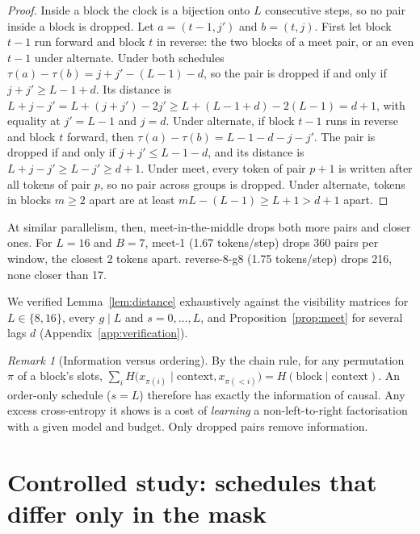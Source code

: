 \documentclass[11pt]{article}
\theoremstyle{definition}
\theoremstyle{remark}
\newtheorem{remark}{Remark}
\newcommand{\sch}[1]{\textsf{#1}}
\begin{document}
\begin{proof}
Inside a block the clock is a bijection onto $L$ consecutive steps, so no pair inside a block is dropped.
Let $a=(t-1,j')$ and $b=(t,j)$.
First let block $t-1$ run forward and block $t$ in reverse: the two blocks of a \sch{meet} pair, or an even $t-1$ under \sch{alternate}.
Under both schedules $\tau(a)-\tau(b)=j+j'-(L-1)-d$, so the pair is dropped if and only if $j+j'\ge L-1+d$.
Its distance is $L+j-j'=L+(j+j')-2j'\ge L+(L-1+d)-2(L-1)=d+1$, with equality at $j'=L-1$ and $j=d$.
Under \sch{alternate}, if block $t-1$ runs in reverse and block $t$ forward, then $\tau(a)-\tau(b)=L-1-d-j-j'$.
The pair is dropped if and only if $j+j'\le L-1-d$, and its distance is $L+j-j'\ge L-j'\ge d+1$.
Under \sch{meet}, every token of pair $p+1$ is written after all tokens of pair $p$, so no pair across groups is dropped.
Under \sch{alternate}, tokens in blocks $m\ge2$ apart are at least $mL-(L-1)\ge L+1>d+1$ apart.
\end{proof}

At similar parallelism, then, meet-in-the-middle drops both more pairs and closer ones.
For $L=16$ and $B=7$, \sch{meet-1} (1.67 tokens/step) drops 360 pairs per window, the closest 2 tokens apart.
\sch{reverse-8-g8} (1.75 tokens/step) drops 216, none closer than 17.

We verified Lemma~\ref{lem:distance} exhaustively against the visibility matrices for $L\in\{8,16\}$, every $g\mid L$ and $s=0,\dots,L$, and Proposition~\ref{prop:meet} for several lags $d$ (Appendix~\ref{app:verification}).

\begin{remark}[Information versus ordering]
\label{rem:chain}
By the chain rule, for any permutation $\pi$ of a block's slots,
$\sum_i H\big(x_{\pi(i)}\mid \text{context},x_{\pi(<i)}\big)=H(\text{block}\mid\text{context})$.
An order-only schedule ($s=L$) therefore has exactly the information of \sch{causal}.
Any excess cross-entropy it shows is a cost of \emph{learning} a non-left-to-right factorisation with a given model and budget.
Only dropped pairs remove information.
\end{remark}

\section{Controlled study: schedules that differ only in the mask}
\label{sec:study}
\end{document}
